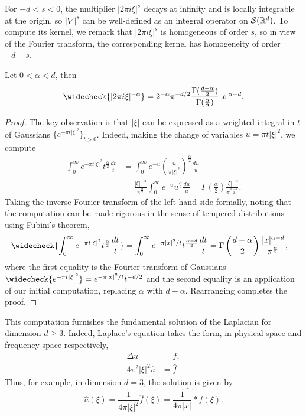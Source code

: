 For $-d < s < 0$, the multiplier $|2\pi i \xi|^s$ decays at infinity and is locally integrable at the origin, so $|\nabla|^s$ can be well-defined as an integral operator on $\mathcal S (\mathbb R^d)$. To compute its kernel, we remark that $|2\pi i \xi|^s$ is homogeneous of order $s$, so in view of the Fourier transform, the corresponding kernel has homogeneity of order $-d - s$. 
	
\begin{proposition}
	Let $0 < \alpha < d$, then 
		\[ \widecheck{|2\pi i \xi|^{-\alpha}} = 2^{-\alpha} \pi^{- d/2} \frac{\Gamma (\frac{d - \alpha}{2})}{\Gamma(\frac{\alpha}{2})} |x|^{\alpha - d}. \]
\end{proposition}

\begin{proof}
	The key observation is that $|\xi|$ can be expressed as a weighted integral in $t$ of Gaussians $\{  e^{-\pi t |\xi|^2}\}_{t > 0}$. Indeed, making the change of variables $u = \pi t|\xi|^2$, we compute
		\begin{align*}
			\int_0^\infty e^{-\pi t |\xi|^2} t^{\frac{\alpha}{2}} \frac{dt}{t}
				&= \int_0^\infty e^{-u} \left( \frac{u}{\pi |\xi|^2} \right)^{\frac{\alpha}{2}} \frac{du}{u}\\
				&= \frac{|\xi|^{-\alpha}}{\pi^{\frac{\alpha}{2}}} \int_0^\infty e^{-u} u^{\frac{\alpha}{2}} \frac{du}{u} = \Gamma \left(\frac{\alpha}{2}\right) \frac{|\xi|^{-\alpha}}{\pi^{\frac{d - \alpha}{2}}}.
		\end{align*}	
	Taking the inverse Fourier transform of the left-hand side formally, noting that the computation can be made rigorous in the sense of tempered distributions using Fubini's theorem, 
		\begin{align*}
			\widecheck{\int_0^\infty e^{-\pi t |\xi|^2} t^{\frac{\alpha}{2}} \frac{dt}{t}}
				&= \int_0^\infty e^{-\pi |x|^2/t} t^{\frac{\alpha - d}{2}} \frac{dt}{t} = \Gamma \left(\frac{d - \alpha}{2}\right) \frac{|x|^{\alpha - d}}{\pi^{\frac{\alpha}{2}}},
		\end{align*}
	where the first equality is the Fourier transform of Gaussians $\widecheck{e^{-\pi t |\xi|^2}} = e^{-\pi |x|^2/t} t^{-d/2}$ and the second equality is an application of our initial computation, replacing $\alpha$ with $d - \alpha$. Rearranging completes the proof. 
\end{proof}

\begin{remark}
	This computation furnishes the fundamental solution of the Laplacian for dimension $d \geq 3$. Indeed, Laplace's equation takes the form, in physical space and frequency space respectively, 
	\begin{align*}
		\Delta u
			&= f, \\
		4\pi^2 |\xi|^2 \widehat u
			&= \widehat f.	
	\end{align*}
	Thus, for example, in dimension $d = 3$, the solution is given by 
		\[ \widehat u (\xi) = \frac{1}{4\pi |\xi|^2} \widehat f(\xi) = \widehat{ \frac{1}{4\pi |x|} * f} (\xi). \]
\end{remark}

